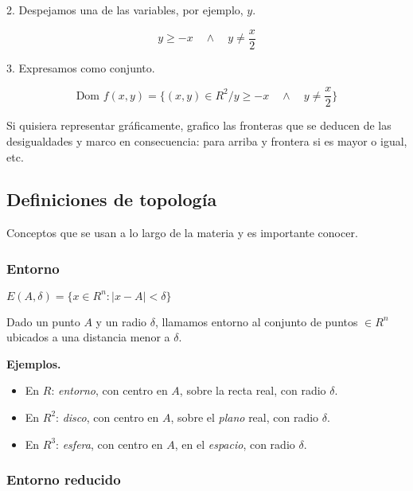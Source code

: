 2. Despejamos una de las variables, por ejemplo, \(y\).

\begin{equation*}
    y \geq -x \quad \land \quad y \neq \frac{x}{2}
\end{equation*}

3. Expresamos como conjunto.

\begin{equation*}
    \text{Dom } f(x,y) = \{(x,y) \in R^{2} / y \geq -x \quad \land \quad y \neq \frac{x}{2}\}
\end{equation*}

Si quisiera representar gráficamente, grafico las fronteras que se deducen de
las desigualdades y marco en consecuencia: para arriba y frontera si es mayor o
igual, etc.

\subsection{Definiciones de topología}

Conceptos que se usan a lo largo de la materia y es importante conocer.

\subsubsection{Entorno}

\(E(A,\delta) = \{x \in R^{n}: |x-A| < \delta\}\)

Dado un punto \(A\) y un radio \(\delta\), llamamos entorno al conjunto de
puntos \(\in R^{n}\) ubicados a una distancia menor a \(\delta\).

\textbf{Ejemplos.}

\begin{itemize}
    \item En \(R\): \textit{entorno}, con centro en \(A\), sobre la recta real,
          con radio \(\delta\).
    \item En \(R^{2}\): \textit{disco}, con centro en \(A\), sobre el
          \textit{plano} real, con radio \(\delta\).
    \item En \(R^{3}\): \textit{esfera}, con centro en \(A\), en el
          \textit{espacio}, con radio \(\delta\).
\end{itemize}


\subsubsection{Entorno reducido}

